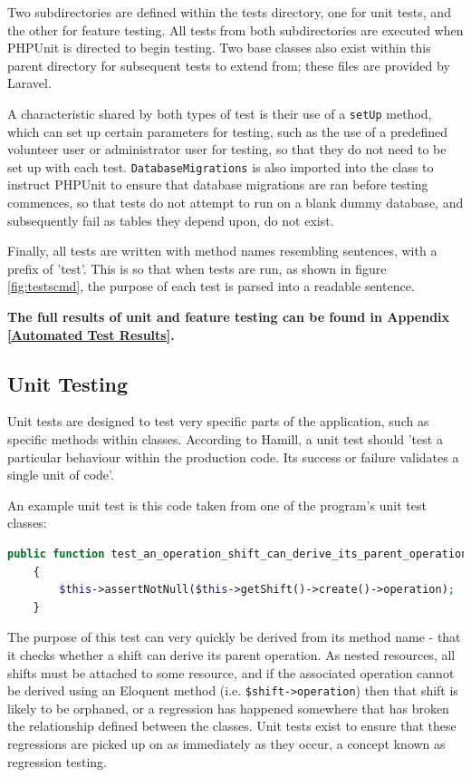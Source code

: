 Two subdirectories are defined within the tests directory, one for unit tests, and the other for feature testing. All tests from both subdirectories are executed when PHPUnit is directed to begin testing. Two base classes also exist within this parent directory for subsequent tests to extend from; these files are provided by Laravel. \cite{Laravel10}

A characteristic shared by both types of test is their use of a \texttt{setUp} method, which can set up certain parameters for testing, such as the use of a predefined volunteer user or administrator user for testing, so that they do not need to be set up with each test. \texttt{DatabaseMigrations} is also imported into the class to instruct PHPUnit to ensure that database migrations are ran before testing commences, so that tests do not attempt to run on a blank dummy database, and subsequently fail as tables they depend upon, do not exist. \cite{Laravel10}

Finally, all tests are written with method names resembling sentences, with a prefix of 'test'. This is so that when tests are run, as shown in figure \ref{fig:testscmd}, the purpose of each test is parsed into a readable sentence.

\textbf{The full results of unit and feature testing can be found in Appendix \ref{Automated Test Results}.}

\subsection{Unit Testing}
Unit tests are designed to test very specific parts of the application, such as specific methods within classes. According to Hamill, a unit test should 'test a particular behaviour within the production code. Its success or failure validates a single unit of code'. \cite{Hamill1}

An example unit test is this code taken from one of the program's unit test classes:

\begin{lstlisting}[language=PHP, breaklines]
    public function test_an_operation_shift_can_derive_its_parent_operation()
    {
        $this->assertNotNull($this->getShift()->create()->operation);
    }
\end{lstlisting}

The purpose of this test can very quickly be derived from its method name - that it checks whether a shift can derive its parent operation. As nested resources, all shifts must be attached to some resource, and if the associated operation cannot be derived using an Eloquent method (i.e. \texttt{\$shift->operation}) then that shift is likely to be orphaned, or a regression has happened somewhere that has broken the relationship defined between the classes. Unit tests exist to ensure that these regressions are picked up on as immediately as they occur, a concept known as regression testing. \cite{Hopping1}

